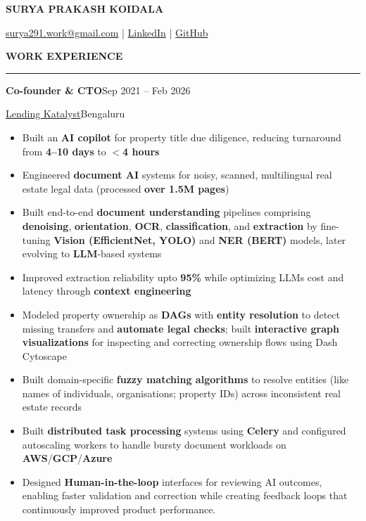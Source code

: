 \documentclass[10pt]{article}
\newcommand{\resumeSection}[1]{%
  \vspace{4pt plus 6pt}%
  \textbf{#1}\par
  \vspace{-5pt}%
  \rule{\linewidth}{0.3pt}\par
  \vspace{0pt}%
}
\newcommand{\resumeRole}[4]{%
  \textbf{#1}\hfill #2\par
  #3\hfill #4\par
}
\newcommand{\kw}[1]{\textbf{#1}}
\begin{document}
\begin{center}
  {\large \textbf{SURYA PRAKASH KOIDALA}}\par
  \vspace{0.5pt}
  \href{surya291.work@gmail.com}{surya291.work@gmail.com} | \href{https://www.linkedin.com/in/surya-prakash-koidala-27a8551a6/}{LinkedIn} | \href{https://github.com/Surya291}{GitHub}
\end{center}


\resumeSection{WORK EXPERIENCE}

\resumeRole{Co-founder \& CTO}{Sep 2021 -- Feb 2026}{\href{https://github.com/Surya291/career/blob/master/LK/journey.md}{Lending Katalyst}}{Bengaluru}
\begin{itemize}
  \item Built an \kw{AI copilot} for property title due diligence, reducing turnaround from \kw{4--10 days} to $<$\kw{4 hours}
  \item Engineered \kw{document AI} systems for noisy, scanned, multilingual real estate legal data (processed \kw{over 1.5M pages})
  \item Built end-to-end \kw{document understanding} pipelines comprising \kw{denoising}, \kw{orientation}, \kw{OCR}, \kw{classification}, and \kw{extraction} by fine-tuning \kw{Vision (EfficientNet, YOLO)} and \kw{NER (BERT)} models, later evolving to \kw{LLM}-based systems 
  \item Improved extraction reliability upto \kw{95\%} while optimizing LLMs cost and latency through \kw{context engineering}
  \item Modeled property ownership as \kw{DAGs} with \kw{entity resolution} to detect missing transfers and \kw{automate legal checks}; built \kw{interactive graph visualizations} for inspecting and correcting ownership flows using Dash Cytoscape
  \item Built domain-specific \kw{fuzzy matching algorithms} to resolve entities (like names of individuals, organisations; property IDs) across inconsistent real estate records
  \item Built \kw{distributed task processing} systems using \kw{Celery} and configured autoscaling workers to handle bursty document workloads on \kw{AWS}/\kw{GCP}/\kw{Azure}
  \item Designed \kw{Human-in-the-loop} interfaces for reviewing AI outcomes, enabling faster validation and correction while creating feedback loops that continuously improved product performance.
\end{itemize}
\end{document}
